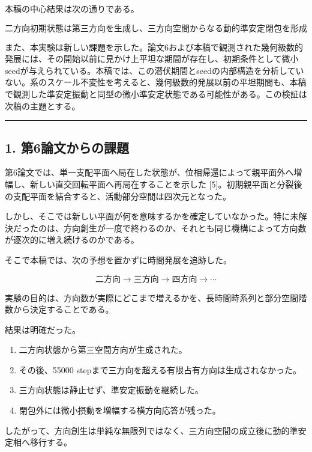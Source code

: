 \documentclass[
  a4paper,
]{ltjsarticle}
\providecommand{\tightlist}{%
  \setlength{\itemsep}{0pt}\setlength{\parskip}{0pt}}
\begin{document}
本稿の中心結果は次の通りである。

\[
\boxed{
\text{二方向初期状態は第三方向を生成し、三方向空間からなる動的準安定閉包を形成する。}
}
\]

また、本実験は新しい課題を示した。論文6および本稿で観測された幾何級数的発展には、その開始以前に見かけ上平坦な期間が存在し、初期条件として微小seedが与えられている。本稿では、この潜伏期間とseedの内部構造を分析していない。系のスケール不変性を考えると、幾何級数的発展以前の平坦期間も、本稿で観測した準安定振動と同型の微小準安定状態である可能性がある。この検証は次稿の主題とする。

\begin{center}\rule{0.5\linewidth}{0.5pt}\end{center}

\subsection{1.
第6論文からの課題}\label{ux7b2c6ux8ad6ux6587ux304bux3089ux306eux8ab2ux984c}

第6論文では、単一支配平面へ局在した状態が、位相帰還によって親平面外へ増幅し、新しい直交回転平面へ再局在することを示した
{[}5{]}。初期親平面と分裂後の支配平面を結合すると、活動部分空間は四次元となった。

しかし、そこでは新しい平面が何を意味するかを確定していなかった。特に未解決だったのは、方向創生が一度で終わるのか、それとも同じ機構によって方向数が逐次的に増え続けるのかである。

そこで本稿では、次の予想を置かずに時間発展を追跡した。

\[
\text{二方向}
\longrightarrow
\text{三方向}
\longrightarrow
\text{四方向}
\longrightarrow\cdots
\]

実験の目的は、方向数が実際にどこまで増えるかを、長時間時系列と部分空間階数から決定することである。

結果は明確だった。

\begin{enumerate}
\def\labelenumi{\arabic{enumi}.}
\tightlist
\item
  二方向状態から第三空間方向が生成された。
\item
  その後、55000 stepまで三方向を超える有限占有方向は生成されなかった。
\item
  三方向状態は静止せず、準安定振動を継続した。
\item
  閉包外には微小摂動を増幅する横方向応答が残った。
\end{enumerate}

したがって、方向創生は単純な無限列ではなく、三方向空間の成立後に動的準安定相へ移行する。
\end{document}
